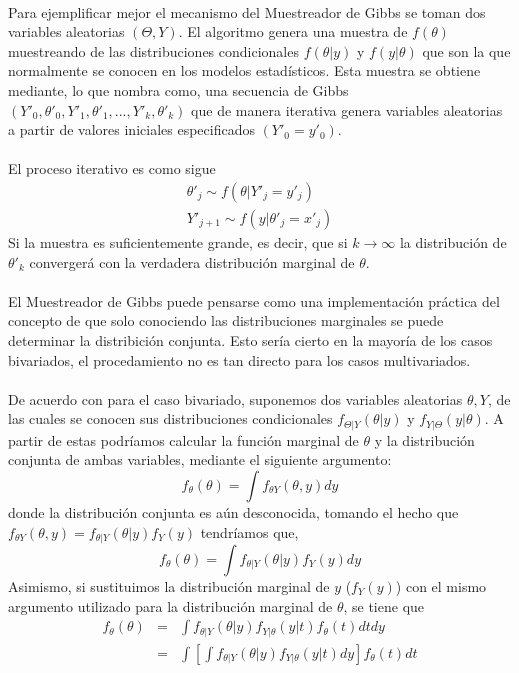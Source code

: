 \\
Para ejemplificar mejor el mecanismo del Muestreador de Gibbs se toman dos variables aleatorias $(\Theta,Y)$. El algoritmo genera una muestra de $f(\theta)$ muestreando de las distribuciones condicionales $f(\theta|y)$ y $f(y|\theta)$ que son la que normalmente se conocen en los modelos estad\'isticos. Esta muestra se obtiene mediante, lo que \cite{casella1992explaining} nombra como, una secuencia de Gibbs $(Y'_0,\theta'_0,Y'_1,\theta'_1,...,Y'_k,\theta'_k)$ que de manera iterativa genera variables aleatorias a partir de valores iniciales especificados $(Y'_0=y'_0)$.\\
\\El proceso iterativo es como sigue\\
\begin{align*}
\theta'_j \sim f(\theta|Y'_j=y'_j)\\
Y'_{j+1} \sim f(y|\theta'_j=x'_j)
\end{align*}
Si la muestra es suficientemente grande, es decir, que si $k \rightarrow \infty$ la distribuci\'on de $\theta'_k$ converger\'a con la verdadera distribuci\'on marginal de $\theta$.\\
\\
El Muestreador de Gibbs puede pensarse como una implementaci\'on pr\'actica del concepto de que solo conociendo las distribuciones marginales se puede determinar la distribici\'on conjunta. Esto ser\'ia cierto en la mayor\'ia de los casos bivariados, el procedamiento no es tan directo para los casos multivariados.\\
\\
De acuerdo con \cite{casella1992explaining} para el caso bivariado, suponemos dos variables aleatorias $\theta,Y$, de las cuales se conocen sus distribuciones condicionales $f_{\Theta|Y}(\theta|y)$ y $f_{Y|\Theta}(y|\theta)$. A partir de estas podr\'iamos calcular la funci\'on marginal de $\theta$ y la distribuci\'on conjunta de ambas variables, mediante  el siguiente argumento:\\
\[f_\theta(\theta)=\int f_{\theta Y}(\theta,y)dy\]
donde la distribuci\'on conjunta es a\'un desconocida, tomando el hecho que $f_{\theta Y}(\theta,y)=f_{\theta|Y}(\theta|y)f_Y(y)$ tendr\'iamos que,\\
\[f_\theta(\theta)=\int f_{\theta|Y}(\theta|y)f_Y(y) dy\]
Asimismo, si sustituimos la distribuci\'on marginal de $y$ ($f_Y(y)$) con el mismo argumento utilizado para la distribuci\'on marginal de $\theta$, se tiene que
\begin{eqnarray*}
f_\theta(\theta) &=& \int f_{\theta|Y}(\theta|y) f_{Y|\theta}(y|t) f_\theta(t)dt dy\\
       &=& \int [ \int  f_{\theta|Y}(\theta|y)f_{Y|\theta}(y|t) dy]  f_\theta(t) dt
\end{eqnarray*}
